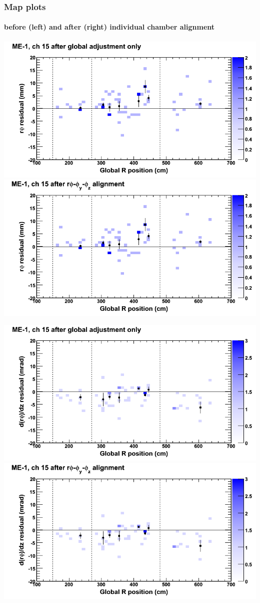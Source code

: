 \documentclass[compress]{beamer}
\begin{document}
\begin{frame}
\frametitle{Map plots}
\framesubtitle{before (left) and after (right) individual chamber alignment}
\includegraphics[width=0.5\linewidth]{ringmapplots_3dof/before_CSCvsr_mem1ch15_x.png} \includegraphics[width=0.5\linewidth]{ringmapplots_3dof/after_CSCvsr_mem1ch15_x.png}

\includegraphics[width=0.5\linewidth]{ringmapplots_3dof/before_CSCvsr_mem1ch15_dxdz.png} \includegraphics[width=0.5\linewidth]{ringmapplots_3dof/after_CSCvsr_mem1ch15_dxdz.png}
\end{frame}
\end{document}
